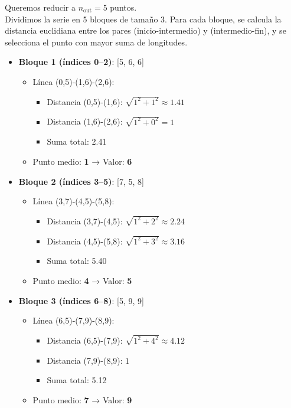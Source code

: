 Queremos reducir a $n_{\text{out}} = 5$ puntos. \\Dividimos la serie en 5 bloques de tamaño 3. Para cada bloque, se calcula la distancia euclidiana entre los pares (inicio-intermedio) y (intermedio-fin), y se selecciona el punto con mayor suma de longitudes.

\begin{itemize}
    \item \textbf{Bloque 1 (índices 0--2)}: [5, 6, 6]
    \begin{itemize}
        \item Línea (0,5)-(1,6)-(2,6):
        \begin{itemize}
            \item Distancia (0,5)-(1,6): $\sqrt{1^2 + 1^2} \approx 1.41$
            \item Distancia (1,6)-(2,6): $\sqrt{1^2 + 0^2} = 1$
            \item Suma total: 2.41
        \end{itemize}
        \item Punto medio: \textbf{1} → Valor: \textbf{6}
    \end{itemize}

    \item \textbf{Bloque 2 (índices 3--5)}: [7, 5, 8]
    \begin{itemize}
        \item Línea (3,7)-(4,5)-(5,8):
        \begin{itemize}
            \item Distancia (3,7)-(4,5): $\sqrt{1^2 + 2^2} \approx 2.24$
            \item Distancia (4,5)-(5,8): $\sqrt{1^2 + 3^2} \approx 3.16$
            \item Suma total: 5.40
        \end{itemize}
        \item Punto medio: \textbf{4} → Valor: \textbf{5}
    \end{itemize}

    \item \textbf{Bloque 3 (índices 6--8)}: [5, 9, 9]
    \begin{itemize}
        \item Línea (6,5)-(7,9)-(8,9):
        \begin{itemize}
            \item Distancia (6,5)-(7,9): $\sqrt{1^2 + 4^2} \approx 4.12$
            \item Distancia (7,9)-(8,9): $1$
            \item Suma total: 5.12
        \end{itemize}
        \item Punto medio: \textbf{7} → Valor: \textbf{9}
    \end{itemize}


\end{itemize}
